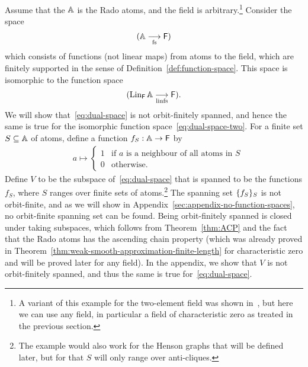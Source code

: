 \begin{myexample}\label{ex:no-function-spaces}
    Assume that the $\mathbb{A}$ is the Rado atoms, and the field is arbitrary.\footnote{A variant of this example for the two-element field was shown in~\cite[Ex. 6.9]{BFKM24}, but here we can use any field, in particular a field of characteristic zero as treated in the previous section.}
    Consider the space 
    \begin{align}\label{eq:dual-space}
    ( \mathbb{A}  \underset{\textup{fs}}{\longrightarrow} \mathsf{F})
    \end{align}
    which consists of functions (not linear maps)  from atoms to the field, which are finitely supported in the sense of Definition~\ref{def:function-space}. This space is  isomorphic to the function space 
    \begin{align}\label{eq:dual-space-two}
    (\operatorname{Lin}_{\mathsf{F}} \mathbb{A} \underset{\textup{linfs}}{\longrightarrow} \mathsf{F}).
    \end{align}
    We will show that~\eqref{eq:dual-space} is not orbit-finitely spanned, and hence the same is true for the isomorphic function space~\eqref{eq:dual-space-two}. 
    For a finite set $S \subseteq \mathbb{A}$ of atoms, define a function  $    f_S : \mathbb{A} \to \mathsf{F}$  by
    \begin{align*}
    \quad 
    a \mapsto
    \begin{cases}
        1 & \text{if $a$ is a neighbour of all atoms in $S$}\\
        0 & \text{otherwise}.
    \end{cases}
    \end{align*}
    Define $V$ to be the subspace of~\eqref{eq:dual-space} that is spanned 
    to be the functions $f_S$, where $S$ ranges over finite sets of atoms.\footnote{The example would also work for the Henson graphs that will be defined later, but for that $S$ will only range over anti-cliques.} 
    The spanning set $\{f_S\}_S$ is not orbit-finite, and as we will show in Appendix~\ref{sec:appendix-no-function-spaces}, no orbit-finite spanning set can be found. Being orbit-finitely spanned is closed under taking subspaces, which follows from   Theorem~\ref{thm:ACP} and the fact that the Rado atoms has the ascending chain property (which was already proved in Theorem~\ref{thm:weak-smooth-approximation-finite-length}  for characteristic zero and will be proved later for any field). In the appendix, we show that $V$ is not orbit-finitely spanned, and thus the same is true  for~\eqref{eq:dual-space}. 
\end{myexample}
 


